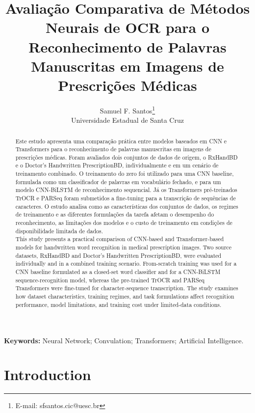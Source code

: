 \documentclass[11pt,a4paper]{article}
\title{Avaliação Comparativa de Métodos Neurais de OCR para o Reconhecimento de Palavras Manuscritas em Imagens de Prescrições Médicas}
\author{
  Samuel F. Santos\thanks{E-mail: sfsantos.cic@uesc.br}
  \\ Universidade Estadual de Santa Cruz
}
\date{} %
\begin{document}
\maketitle

\begin{abstract}
Este estudo apresenta uma comparação prática entre modelos baseados em CNN e Transformers para o reconhecimento de palavras manuscritas em imagens de prescrições médicas. Foram avaliados dois conjuntos de dados de origem, o RxHandBD e o Doctor’s Handwritten PrescriptionBD, individualmente e em um cenário de treinamento combinado. O treinamento do zero foi utilizado para uma CNN baseline, formulada como um classificador de palavras em vocabulário fechado, e para um modelo CNN-BiLSTM de reconhecimento sequencial. Já os Transformers pré-treinados TrOCR e PARSeq foram submetidos a fine-tuning para a transcrição de sequências de caracteres. O estudo analisa como as características dos conjuntos de dados, os regimes de treinamento e as diferentes formulações da tarefa afetam o desempenho do reconhecimento, as limitações dos modelos e o custo de treinamento em condições de disponibilidade limitada de dados.\\

This study presents a practical comparison of CNN-based and Transformer-based models for handwritten word recognition in medical prescription images. Two source datasets, RxHandBD and Doctor’s Handwritten PrescriptionBD, were evaluated individually and in a combined training scenario. From-scratch training was used for a CNN baseline formulated as a closed-set word classifier and for a CNN-BiLSTM sequence-recognition model, whereas the pre-trained TrOCR and PARSeq Transformers were fine-tuned for character-sequence transcription. The study examines how dataset characteristics, training regimes, and task formulations affect recognition performance, model limitations, and training cost under limited-data conditions.
\end{abstract}

\noindent\textbf{Keywords:} Neural Network; Convulation; Transformers; Artificial Intelligence.

\section{Introduction}
\label{sec:introduction}



\end{document}
